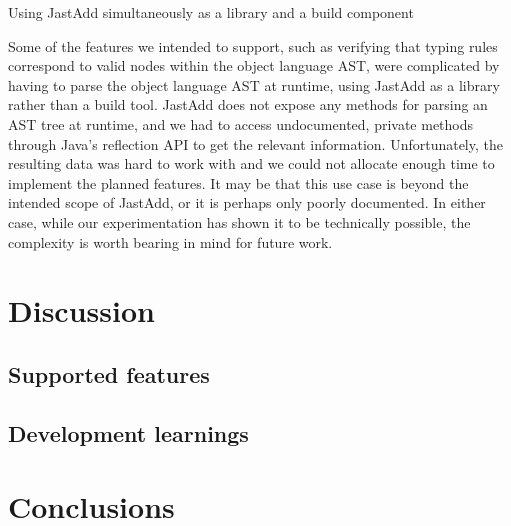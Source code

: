 \documentclass[nofilelist]{cslthse-msc}
\begin{document}
Using JastAdd simultaneously as a library and a build component

Some of the features we intended to support, such as verifying that typing rules correspond to valid nodes within the object language AST, were complicated by having to parse the object language AST at runtime, using JastAdd as a library rather than a build tool.
JastAdd does not expose any methods for parsing an AST tree at runtime, and we had to access undocumented, private methods through Java's reflection API to get the relevant information.
Unfortunately, the resulting data was hard to work with and we could not allocate enough time to implement the planned features.
It may be that this use case is beyond the intended scope of JastAdd, or it is perhaps only poorly documented.
In either case, while our experimentation has shown it to be technically possible, the complexity is worth bearing in mind for future work.


\chapter{Discussion} %
\section{Supported features}
\section{Development learnings}

\chapter{Conclusions} %
\end{document}
